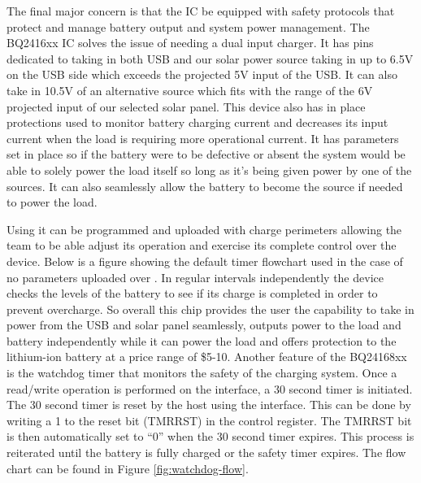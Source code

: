 The final major concern is that the IC be equipped with safety protocols that protect and manage battery output and system power management. The BQ2416xx IC solves the issue of needing a dual input charger. It has pins dedicated to taking in both USB and our solar power source taking in up to 6.5V on the USB side which exceeds the projected 5V input of the USB. It can also take in 10.5V of an alternative source which fits with the range of the 6V projected input of our selected solar panel. This device also has in place protections used to monitor battery charging current and decreases its input current when the load is requiring more operational current. It has parameters set in place so if the battery were to be defective or absent the system would be able to solely power the load itself so long as it's being given power by one of the sources. It can also seamlessly allow the battery to become the source if needed to power the load.

Using \iic it can be programmed and uploaded with charge perimeters allowing the team to be able adjust its operation and exercise its complete control over the device. Below is a figure showing the default timer flowchart used in the case of no parameters uploaded over \iic. In regular intervals independently the device checks the levels of the battery to see if its charge is completed in order to prevent overcharge. So overall this chip provides the user the capability to take in power from the USB and solar panel seamlessly, outputs power to the load and battery independently while it can power the load and offers protection to the lithium-ion battery at a price range of \$5-10. Another feature of the BQ24168xx is the watchdog timer that monitors the safety of the charging system. Once a read/write operation is performed on the \iic interface, a 30 second timer is initiated. The
30 second timer is reset by the host using the \iic interface. This can be done by writing a 1 to the reset bit (TMRRST) in the control register. The TMRRST bit is then automatically set to “0” when the 30 second timer expires. This process is reiterated until the battery is fully charged or the safety timer expires. The flow chart can be found in Figure \ref{fig:watchdog-flow}.

